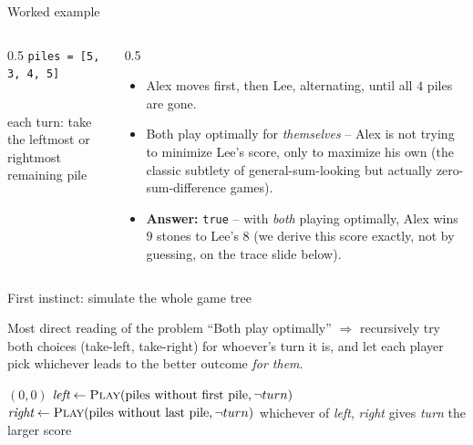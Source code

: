 \documentclass[11pt,aspectratio=169]{beamer}
\begin{document}
\begin{frame}{Worked example}
  \begin{columns}
  \begin{column}{0.5\textwidth}
  \texttt{piles = [5, 3, 4, 5]}
  \begin{center}
  \\[2pt]
  {\scriptsize each turn: take the leftmost or rightmost remaining pile}
  \end{center}
  \end{column}
  \begin{column}{0.5\textwidth}
  \small
  \begin{itemize}
    \item Alex moves first, then Lee, alternating, until all $4$ piles are gone.
    \item Both play optimally for \emph{themselves} -- Alex is not trying to minimize
    Lee's score, only to maximize his own (the classic subtlety of general-sum-looking
    but actually zero-sum-difference games).
    \item \textbf{Answer:} \texttt{true} -- with \emph{both} playing optimally, Alex
    wins $9$ stones to Lee's $8$ (we derive this score exactly, not by guessing, on the
    trace slide below).
  \end{itemize}
  \end{column}
  \end{columns}
\end{frame}

\begin{frame}{First instinct: simulate the whole game tree}
  \begin{block}{Most direct reading of the problem}
    ``Both play optimally'' $\Rightarrow$ recursively try both choices (take-left,
    take-right) for whoever's turn it is, and let each player pick whichever leads to
    the better outcome \emph{for them}.
  \end{block}
  \begin{algorithmic}[1]
       \Return $(0, 0)$  \EndIf
      \State $\textit{left} \gets \Call{Play}{\text{piles without first pile}, \lnot
      turn}$ 
      \State $\textit{right} \gets \Call{Play}{\text{piles without last pile}, \lnot
      turn}$ 
      \State \Return whichever of \textit{left}, \textit{right} gives \textit{turn} the
      larger score
    \EndFunction
  \end{algorithmic}
\end{frame}
\end{document}
